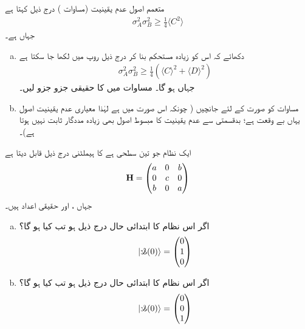 \quad متعمم اصول عدم یقینیت (مساوات ) درج ذیل کہتا ہے
 \begin{align*} 
\sigma_{A}^{2}\sigma_{B}^{2}\geq\frac{1}{4}\langle C^{2} \rangle 
 \end{align*} 
جہاں  ہے۔
\begin{enumerate}[a.] 
\item
دکھائے کہ اس کو زیادہ مستحکم بنا کر درج ذیل روپ میں لکھا جا سکتا ہے
 \begin{align}\label{مساوات_سوال_مستحکم_عدم_یقینیت} 
\sigma_{A}^{2}\sigma_{B}^{2}\geq\frac{1}{4}(\langle C\rangle^{2}+\langle D \rangle ^{2}) 
 \end{align} 
جہاں  ہو گا۔  مساوات  میں  کا حقیقی جزو  جزو لیں۔ 
\item
مساوات  کو  صورت کے لئے جانچیں ( چونکہ اس صورت میں  ہے لہٰذا معیاری عدم یقینیت اصول یہاں بے وقعت ہے؛ بدقسمتی سے عدم یقینیت کا مبسوط اصول بھی زیادہ مددگار ثابت نہیں ہوتا ہے)۔ 
\end{enumerate}

ایک نظام جو تین سطحی ہے کا ہیملٹنی درج ذیل قابل دیتا ہے
 \begin{align*} 
\operatorname{\mathbf{H}}=\begin{pmatrix}
a&0&b\\
0&c&0\\
b&0&a
\end{pmatrix} 
 \end{align*} 
جہاں ،  اور  حقیقی اعداد ہیں۔
\begin{enumerate}[a.]
 \item
 اگر اس نظام کا ابتدائی حال درج ذیل ہو تب  کیا ہو گا؟ 
 \begin{align*} 
|\s(0) \rangle=\begin{pmatrix}
0\\
1\\
0
\end{pmatrix} 
 \end{align*} 
\item
 اگر اس نظام کا ابتدائی حال درج ذیل ہو تب  کیا ہو گا؟ 
 \begin{align*} 
| \s(0)\rangle =\begin{pmatrix}
0\\
0\\
1
\end{pmatrix} 
 \end{align*} 
\end{enumerate}

